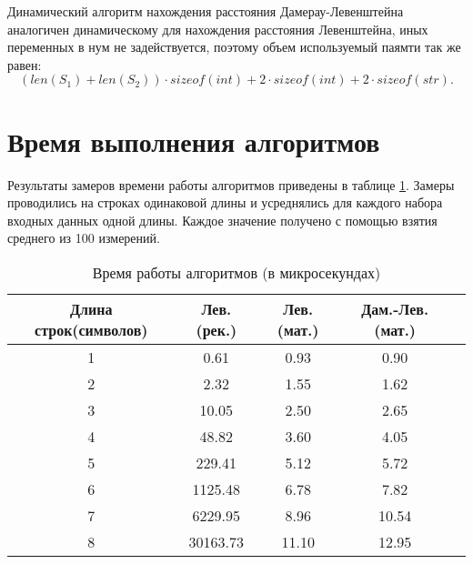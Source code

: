 Динамический алгоритм нахождения расстояния Дамерау-Левенштейна аналогичен динамическому для нахождения расстояния Левенштейна, иных переменных в нум не задействуется, поэтому объем используемый паямти так же равен:
\begin{equation}
(len(S_1) + len(S_2)) \cdot sizeof(int) + 2 \cdot sizeof(int) + 2 \cdot sizeof(str).
\end{equation}

\section{Время выполнения алгоритмов}
Результаты замеров времени работы алгоритмов приведены в таблице \ref{tbl:time_mes}. Замеры проводились на строках одинаковой длины и усреднялись для каждого набора входных данных одной длины. Каждое значение получено с помощью взятия среднего из 100 измерений.

\begin{table}[h]
    \begin{center}
        \begin{threeparttable}
        \captionsetup{justification=raggedright,singlelinecheck=off}
        \caption{Время работы алгоритмов (в микросекундах)}
        \label{tbl:time_mes}
        \begin{tabular}{|c|c|c|c|c|}
            \hline
                        Длина строк(символов) & Лев.(рек.) & Лев.(мат.) & Дам.-Лев.(мат.)\\
                        \hline
                        1 & 0.61 & 0.93 & 0.90\\
                        \hline
                        2 & 2.32 & 1.55 & 1.62\\
                        \hline
                        3 & 10.05 & 2.50 & 2.65\\
                        \hline
                        4 & 48.82 & 3.60 & 4.05\\
                        \hline
                        5 & 229.41 & 5.12 & 5.72\\
                        \hline
                        6 & 1125.48 & 6.78 & 7.82\\
                        \hline
                        7 & 6229.95 & 8.96 & 10.54\\
                        \hline
                        8 & 30163.73 & 11.10 & 12.95\\
                        \hline
		\end{tabular}
	\end{threeparttable}
	\end{center}
\end{table}

